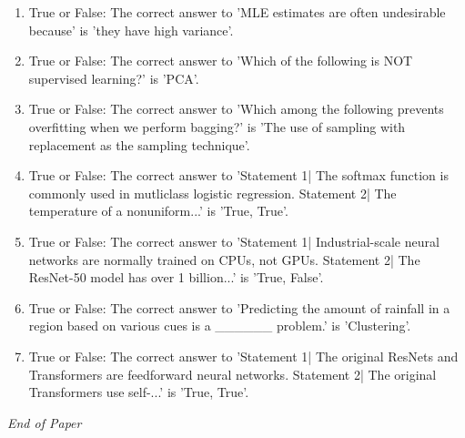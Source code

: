 \documentclass[12pt]{article}
\begin{document}
\begin{enumerate}[label=\arabic*.]
\item True or False: The correct answer to 'MLE estimates are often undesirable because' is 'they have high variance'.
\item True or False: The correct answer to 'Which of the following is NOT supervised learning?' is 'PCA'.
\item True or False: The correct answer to 'Which among the following prevents overfitting when we perform bagging?' is 'The use of sampling with replacement as the sampling technique'.
\item True or False: The correct answer to 'Statement 1| The softmax function is commonly used in mutliclass logistic regression. Statement 2| The temperature of a nonuniform...' is 'True, True'.
\item True or False: The correct answer to 'Statement 1| Industrial-scale neural networks are normally trained on CPUs, not GPUs. Statement 2| The ResNet-50 model has over 1 billion...' is 'True, False'.
\item True or False: The correct answer to 'Predicting the amount of rainfall in a region based on various cues is a \_\_\_\_\_\_ problem.' is 'Clustering'.
\item True or False: The correct answer to 'Statement 1| The original ResNets and Transformers are feedforward neural networks. Statement 2| The original Transformers use self-...' is 'True, True'.
\end{enumerate}

\vfill
\noindent\textit{End of Paper}
\end{document}
